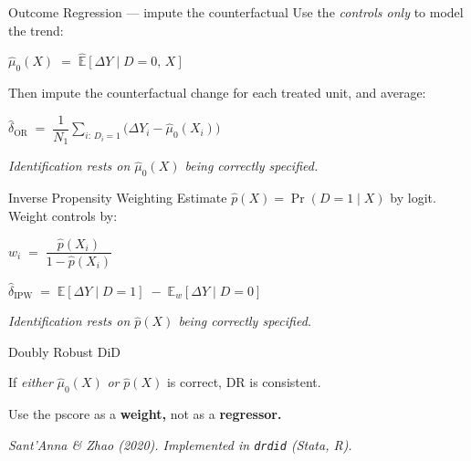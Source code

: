 \documentclass[11pt,aspectratio=169]{beamer}
\begin{document}
\begin{frame}{Outcome Regression --- impute the counterfactual}
\vspace{0.6em}
Use the \textit{controls only} to model the trend:
\vspace{0.2em}
\begin{center}
\small
$\widehat\mu_0(X) \;=\; \widehat{\mathbb{E}}[\Delta Y \mid D{=}0,\, X]$
\end{center}
\vspace{0.6em}
Then impute the counterfactual change for each treated unit, and average:
\vspace{0.2em}
\begin{center}
\small
$\widehat\delta_{\text{OR}} \;=\; \dfrac{1}{N_1}\displaystyle\sum_{i:\, D_i=1}\big(\Delta Y_i - \widehat\mu_0(X_i)\big)$
\end{center}
\vspace{0.4em}
\begin{center}
\small\color{warmgray}\itshape
Identification rests on $\widehat\mu_0(X)$ being correctly specified.
\end{center}
\end{frame}

\begin{frame}{Inverse Propensity Weighting}
\vspace{0.8em}
Estimate $\widehat p(X) = \Pr(D{=}1 \mid X)$ by logit. Weight controls by:
\vspace{0.2em}
\begin{center}
$w_i \;=\; \dfrac{\widehat p(X_i)}{1 - \widehat p(X_i)}$
\end{center}
\vspace{0.6em}
\begin{center}
\small
$\widehat\delta_{\text{IPW}} \;=\; \mathbb{E}[\Delta Y \mid D{=}1] \;-\; \mathbb{E}_w[\Delta Y \mid D{=}0]$
\end{center}
\vspace{0.6em}
\begin{center}
\small\color{warmgray}\itshape
Identification rests on $\widehat p(X)$ being correctly specified.
\end{center}
\end{frame}

\begin{frame}{Doubly Robust DiD}
\vspace{1.2em}
\begin{center}
\large
If \textit{either} $\widehat\mu_0(X)$ \textit{or} $\widehat p(X)$ is correct, DR is consistent.
\end{center}
\vspace{1em}
\begin{center}
\large
Use the pscore as a \textbf{weight,} not as a \textbf{regressor.}
\end{center}
\vspace{0.8em}
\begin{center}
\small\color{warmgray}\itshape
Sant'Anna \& Zhao (2020). \;Implemented in \texttt{drdid} (Stata, R).
\end{center}
\end{frame}
\end{document}
